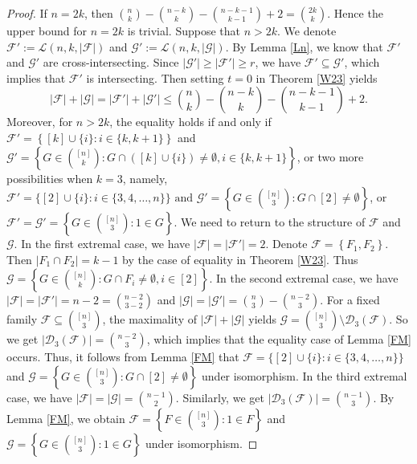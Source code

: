\documentclass[11pt]{article}
\numberwithin{equation}{section}
\begin{document}
\begin{proof}
If $n = 2 k$, then $
\binom{n}{k}-\binom{n-k}{k}-\binom{n-k-1}{k-1}+2=\binom{2k}{k}$.
Hence the upper bound for $n = 2 k$ is trivial. Suppose that $n > 2 k$. We denote $\mathcal{F}':=\mathcal{L}(n, k,|\mathcal{F}|)$ and $\mathcal{G}':=\mathcal{L}(n, k,|\mathcal{G}|)$. 
By Lemma \ref{Ln}, we know that 
$\mathcal{F}'$ and $\mathcal{G}'$ are cross-intersecting. Since $|\mathcal{G}'| \geq|\mathcal{F}'| \geq r$, we 
have $\mathcal{F}' \subseteq \mathcal{G}'$, which implies that $\mathcal{F}'$ is intersecting. Then setting $t=0$ in Theorem \ref{W23} yields $$
|\mathcal{F}|+|\mathcal{G}| = 
    |\mathcal{F}'| + |\mathcal{G}'| \leq\binom{n}{k}-\binom{n-k}{k}-\binom{n-k-1}{k-1}+2.
$$
Moreover, for $n > 2 k$, the equality holds if and only if $\mathcal{F}'=\left\{[k]\cup\{i\}: i\in\{k,k+1\}\right\}$ and $\mathcal{G}'=\left\{G \in\binom{[n]}{k}: G \cap ([k]\cup\{i\})\neq \emptyset, i\in\{k,k+1\}\right\}$, or two more possibilities when $k=3$, namely, $\mathcal{F}'=\{[2] \cup\{i\}: i \in\{3, 4, \ldots, n\}\}\text{ and } \mathcal{G}'=\left\{G \in\binom{[n]}{3}: G \cap[2] \neq \emptyset\right\}$, or $\mathcal{F}'=\mathcal{G}'=\left\{G \in\binom{[n]}{3}: 1\in G \right\}$.
We need to return to the structure of $\mathcal{F}$ and $\mathcal{G}$. 
In the first extremal case, 
we have $|\mathcal{F}|=|\mathcal{F}'|=2$. 
Denote $\mathcal{F}=\left\{F_1, F_2\right\}$. Then $\left|F_1 \cap F_2\right|=k-1$  by the case of equality in Theorem \ref{W23}. Thus $\mathcal{G}=\left\{G \in\binom{[n]}{k}: G \cap F_i \neq\emptyset, i\in[2]\right\}$. 
In the second extremal case, we have $|\mathcal{F}|=|\mathcal{F}'|=n-2 = 
{n-2 \choose 3-2}$ and $|\mathcal{G}|=|\mathcal{G}'|={n \choose3} - {n-2 \choose 3}$. 
For a fixed family $\mathcal{F}\subseteq \binom{[n]}{3}$, 
the maximality of $|\mathcal{F}| + |\mathcal{G}|$ yields $\mathcal{G} = \binom{[n]}{3} \setminus \mathcal{D}_3(\mathcal{F})$. So we get  
$|\mathcal{D}_3(\mathcal{F})|={n-2 \choose 3}$, which implies that the equality case of  Lemma \ref{FM} occurs. 
Thus, it follows from Lemma \ref{FM} that  $\mathcal{F}=\{[2] \cup\{i\}: i \in\{3,4,  \ldots, n\}\}$ and  $\mathcal{G}= \left\{G \in\binom{[n]}{3}: G \cap[2] \neq \emptyset\right\}$ under isomorphism.
In the third extremal case, we have 
$|\mathcal{F}|=|\mathcal{G}|={n-1 \choose 2}$. Similarly, we get  $| \mathcal{D}_{3}(\mathcal{F})|=\binom{n-1}{3}$. By Lemma \ref{FM}, we obtain $\mathcal{F}= \left\{F\in\binom{[n]}{3}: 1\in F\right\}$ and 
$\mathcal{G}= \left\{G\in\binom{[n]}{3}: 1\in G\right\}$ under isomorphism.  
\end{proof}
\end{document}
